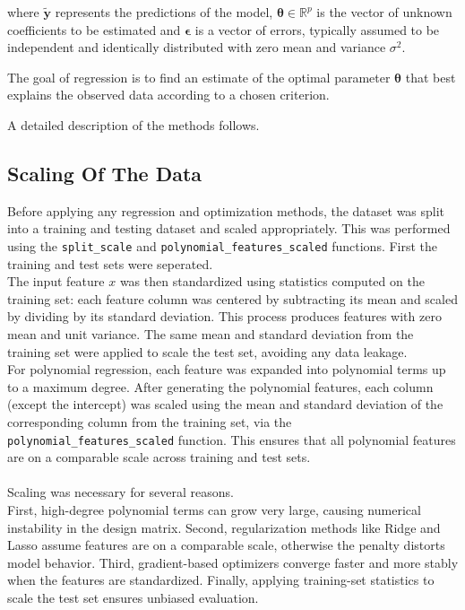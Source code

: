 \documentclass[
 reprint,            %
 amsmath,amssymb,
 aps,
]{revtex4-2}
\begin{document}
where $\tilde{\mathbf{y}}$ represents the predictions of the model, $\boldsymbol{\theta} \in \mathbb{R}^p$ is the vector of unknown coefficients to be estimated and $\boldsymbol{\epsilon}$ is a vector of errors, typically assumed to be independent and identically distributed with zero mean and variance $\sigma^2$.

The goal of regression is to find an estimate of the optimal parameter $\boldsymbol{\theta}$ that best explains the observed data according to a chosen criterion. 

A detailed description of the methods follows.

\subsection{Scaling Of The Data}
Before applying any regression and optimization methods, the dataset was split into a training and testing dataset and scaled appropriately.
This was performed using the \texttt{split\_scale} and \texttt{polynomial\_features\_scaled} functions.
First the training and test sets were seperated.\\
The input feature $x$ was then standardized using statistics computed on the training set: each feature column was centered by subtracting its mean and scaled by dividing by its standard deviation.
This process produces features with zero mean and unit variance.
The same mean and standard deviation from the training set were applied to scale the test set, avoiding any data leakage.\\
For polynomial regression, each feature was expanded into polynomial terms up to a maximum degree.
After generating the polynomial features, each column (except the intercept) was scaled using the mean and standard deviation of the corresponding column from the training set, via the \texttt{polynomial\_features\_scaled} function.
This ensures that all polynomial features are on a comparable scale across training and test sets.\\\\
Scaling was necessary for several reasons.\\
First, high-degree polynomial terms can grow very large, causing numerical instability in the design matrix.
Second, regularization methods like Ridge and Lasso assume features are on a comparable scale, otherwise the penalty distorts model behavior.
Third, gradient-based optimizers converge faster and more stably when the features are standardized.
Finally, applying training-set statistics to scale the test set ensures unbiased evaluation.
\end{document}
